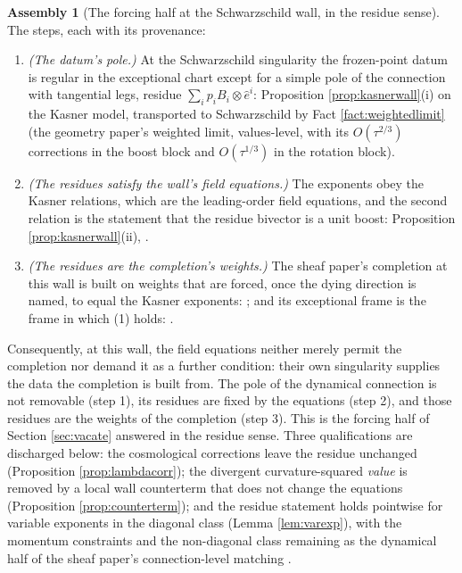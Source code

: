 \documentclass[11pt]{article}
\theoremstyle{definition}
\newtheorem{assembly}[theorem]{Assembly}
\begin{document}
\begin{assembly}[The forcing half at the Schwarzschild wall, in the residue sense]\label{asm:forcing}
The steps, each with its provenance:
\begin{enumerate}
\item \emph{(The datum's pole.)} At the Schwarzschild singularity the frozen-point datum is regular in the exceptional chart except for a simple pole of the connection with tangential legs, residue $\sum_i p_iB_i\otimes\hat e^i$: Proposition \ref{prop:kasnerwall}(i) on the Kasner model, transported to Schwarzschild by Fact \ref{fact:weightedlimit} (the geometry paper's weighted limit, values-level, with its $O(\tau^{2/3})$ corrections in the boost block and $O(\tau^{1/3})$ in the rotation block).
\item \emph{(The residues satisfy the wall's field equations.)} The exponents obey the Kasner relations, which are the leading-order field equations, and the second relation is the statement that the residue bivector is a unit boost: Proposition \ref{prop:kasnerwall}(ii), \cite[Prop.~8.26(3)]{ButlerT4}.
\item \emph{(The residues are the completion's weights.)} The sheaf paper's completion at this wall is built on weights that are forced, once the dying direction is named, to equal the Kasner exponents: \cite[Thm.~8.16]{ButlerT4}; and its exceptional frame is the frame in which (1) holds: \cite[Thm.~8.27]{ButlerT4}.
\end{enumerate}
Consequently, at this wall, the field equations neither merely permit the completion nor demand it as a further condition: their own singularity supplies the data the completion is built from. The pole of the dynamical connection is not removable (step 1), its residues are fixed by the equations (step 2), and those residues are the weights of the completion (step 3). This is the forcing half of Section \ref{sec:vacate} answered in the residue sense. Three qualifications are discharged below: the cosmological corrections leave the residue unchanged (Proposition \ref{prop:lambdacorr}); the divergent curvature-squared \emph{value} is removed by a local wall counterterm that does not change the equations (Proposition \ref{prop:counterterm}); and the residue statement holds pointwise for variable exponents in the diagonal class (Lemma \ref{lem:varexp}), with the momentum constraints and the non-diagonal class remaining as the dynamical half of the sheaf paper's connection-level matching \cite[Rem.~8.28]{ButlerT4}.
\end{assembly}
\end{document}
